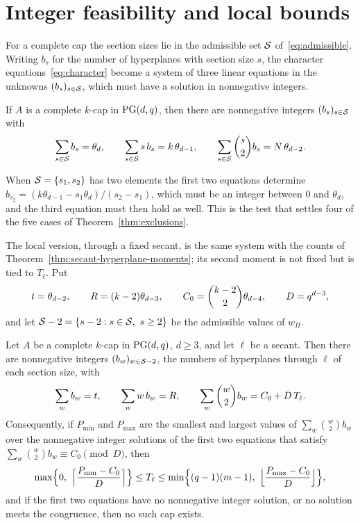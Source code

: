 \section{Integer feasibility and local bounds}
\label{sec:feasibility}

For a complete cap the section sizes lie in the admissible set \(\mathcal S\)
of~\eqref{eq:admissible}.  Writing \(b_s\) for the number of hyperplanes
with section size \(s\), the character equations~\eqref{eq:character}
become a system of three linear equations in the unknowns
\((b_s)_{s\in\mathcal S}\), which must have a solution in nonnegative integers.

\begin{proposition}
\label{prop:global-feasibility}
If \(A\) is a complete \(k\)-cap in \(\mathrm{PG}(d,q)\), then there are
nonnegative integers \((b_s)_{s\in\mathcal S}\) with
\[
 \sum_{s\in\mathcal S}b_s=\theta_d,
 \qquad
 \sum_{s\in\mathcal S}s\,b_s=k\,\theta_{d-1},
 \qquad
 \sum_{s\in\mathcal S}\binom{s}{2}b_s=N\,\theta_{d-2}.
\]
\end{proposition}

When \(\mathcal S=\{s_1,s_2\}\) has two elements the first two equations
determine \(b_{s_2}=(k\theta_{d-1}-s_1\theta_d)/(s_2-s_1)\), which must be
an integer between \(0\) and \(\theta_d\), and the third equation must
then hold as well.  This is the test that settles four of the five cases
of Theorem~\ref{thm:exclusions}.

The local version, through a fixed secant, is the same system with the
counts of Theorem~\ref{thm:secant-hyperplane-moments}; its second moment
is not fixed but is tied to \(T_\ell\).  Put
\begin{equation}
 t=\theta_{d-2},\qquad R=(k-2)\theta_{d-3},\qquad
 C_0=\binom{k-2}{2}\theta_{d-4},\qquad D=q^{d-3},
\label{eq:local-constants}
\end{equation}
and let \(\mathcal S-2=\{s-2:s\in\mathcal S,\ s\ge2\}\) be the admissible values of
\(w_\Pi\).

\begin{theorem}
\label{thm:local-bounds}
Let \(A\) be a complete \(k\)-cap in \(\mathrm{PG}(d,q)\), \(d\ge3\), and let
\(\ell\) be a secant.  Then there are nonnegative integers
\((b_w)_{w\in\mathcal S-2}\), the numbers of hyperplanes through \(\ell\) of each
section size, with
\begin{equation}
 \sum_w b_w=t,\qquad \sum_w w\,b_w=R,\qquad
 \sum_w\binom{w}{2}b_w=C_0+D\,T_\ell .
\label{eq:local-system}
\end{equation}
Consequently, if \(P_{\min}\) and \(P_{\max}\) are the smallest and
largest values of \(\sum_w\binom{w}{2}b_w\) over the nonnegative integer
solutions of the first two equations that satisfy
\(\sum_w\binom{w}{2}b_w\equiv C_0\pmod D\), then
\begin{equation}
 \max\Bigl\{0,\ \Bigl\lceil\frac{P_{\min}-C_0}{D}\Bigr\rceil\Bigr\}
 \le T_\ell\le
 \min\Bigl\{(q-1)(m-1),\ \Bigl\lfloor\frac{P_{\max}-C_0}{D}\Bigr\rfloor\Bigr\},
\label{eq:local-bounds}
\end{equation}
and if the first two equations have no nonnegative integer solution, or
no solution meets the congruence, then no such cap exists.
\end{theorem}

